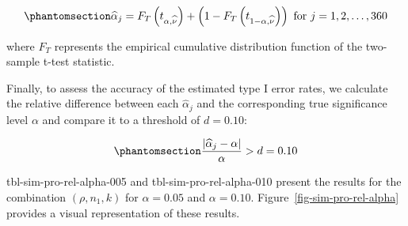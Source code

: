 \documentclass[
  12pt]{article}
\begin{document}
\begin{equation}\phantomsection\label{eq-type-I-error-rates}{\widehat{\alpha}_j = F_{T}\left(t_{\alpha,\widehat{\nu}}\right) + \left(1 - F_{T}\left(t_{1-\alpha,\widehat{\nu}}\right)\right) \text{ for } j = 1, 2, \ldots, 360}\end{equation}

where \(F_T\) represents the empirical cumulative distribution function
of the two-sample t-test statistic.

Finally, to assess the accuracy of the estimated type I error rates, we
calculate the relative difference between each \(\widehat{\alpha}_j\)
and the corresponding true significance level \(\alpha\) and compare it
to a threshold of \(d=0.10\):

\begin{equation}\phantomsection\label{eq-pro-rel-alpha}{\frac{|\widehat{\alpha}_j - \alpha|}{\alpha} > d = 0.10}\end{equation}

tbl-sim-pro-rel-alpha-005 and tbl-sim-pro-rel-alpha-010 present the
results for the combination \((\rho, n_1, k)\) for \(\alpha = 0.05\) and
\(\alpha = 0.10\). Figure~\ref{fig-sim-pro-rel-alpha} provides a visual
representation of these results.

\begingroup\fontsize{7}{9}\selectfont
\end{document}
